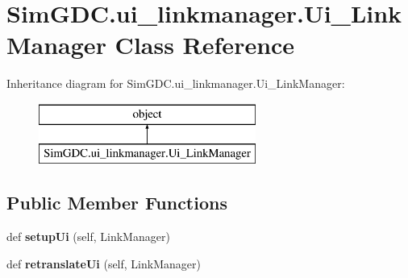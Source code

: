 \hypertarget{class_sim_g_d_c_1_1ui__linkmanager_1_1_ui___link_manager}{}\section{Sim\+G\+D\+C.\+ui\+\_\+linkmanager.\+Ui\+\_\+\+Link\+Manager Class Reference}
\label{class_sim_g_d_c_1_1ui__linkmanager_1_1_ui___link_manager}
Inheritance diagram for Sim\+G\+D\+C.\+ui\+\_\+linkmanager.\+Ui\+\_\+\+Link\+Manager\+:\begin{figure}[H]
\begin{center}
\leavevmode
\includegraphics[height=2.000000cm]{class_sim_g_d_c_1_1ui__linkmanager_1_1_ui___link_manager}
\end{center}
\end{figure}
\subsection*{Public Member Functions}
\begin{DoxyCompactItemize}
\item 
\hypertarget{class_sim_g_d_c_1_1ui__linkmanager_1_1_ui___link_manager_ad26aced4b774a9997b524789ba6cbbae}{}def {\bfseries setup\+Ui} (self, Link\+Manager)\label{class_sim_g_d_c_1_1ui__linkmanager_1_1_ui___link_manager_ad26aced4b774a9997b524789ba6cbbae}

\item 
\hypertarget{class_sim_g_d_c_1_1ui__linkmanager_1_1_ui___link_manager_a2d21a8bfbee1060b82f5eabe09c37ed0}{}def {\bfseries retranslate\+Ui} (self, Link\+Manager)\label{class_sim_g_d_c_1_1ui__linkmanager_1_1_ui___link_manager_a2d21a8bfbee1060b82f5eabe09c37ed0}

\end{DoxyCompactItemize}
